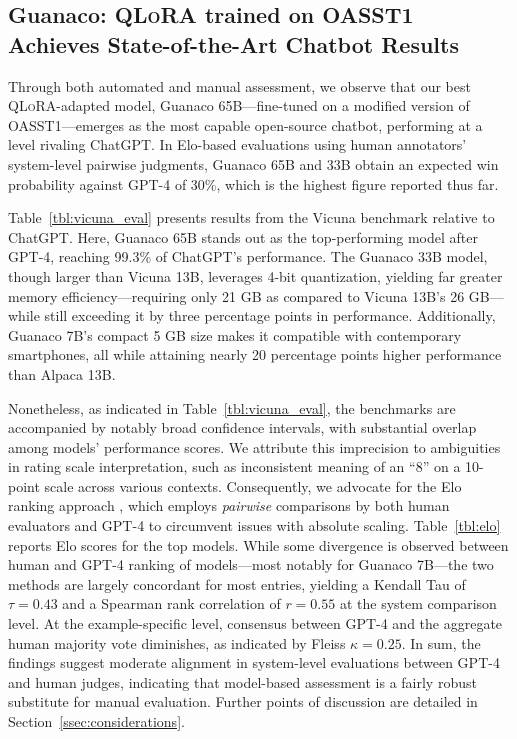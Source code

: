 \subsection{\textbf{Guanaco}: \textsc{QLoRA} trained on OASST1 Achieves State-of-the-Art Chatbot Results} 

Through both automated and manual assessment, we observe that our best \textsc{QLoRA}-adapted model, {Guanaco} 65B—fine-tuned on a modified version of OASST1—emerges as the most capable open-source chatbot, performing at a level rivaling ChatGPT. In Elo-based evaluations using human annotators’ system-level pairwise judgments, {Guanaco} 65B and 33B obtain an expected win probability against GPT-4 of 30\%, which is the highest figure reported thus far.

Table~\ref{tbl:vicuna_eval} presents results from the Vicuna benchmark \cite{vicuna2023} relative to ChatGPT. Here, {Guanaco} 65B stands out as the top-performing model after GPT-4, reaching 99.3\% of ChatGPT’s performance. The {Guanaco} 33B model, though larger than Vicuna 13B, leverages 4-bit quantization, yielding far greater memory efficiency—requiring only 21 GB as compared to Vicuna 13B’s 26 GB—while still exceeding it by three percentage points in performance. Additionally, {Guanaco} 7B’s compact 5 GB size makes it compatible with contemporary smartphones, all while attaining nearly 20 percentage points higher performance than Alpaca 13B.

Nonetheless, as indicated in Table~\ref{tbl:vicuna_eval}, the benchmarks are accompanied by notably broad confidence intervals, with substantial overlap among models’ performance scores. We attribute this imprecision to ambiguities in rating scale interpretation, such as inconsistent meaning of an “8” on a 10-point scale across various contexts. Consequently, we advocate for the Elo ranking approach \citep{elo1967proposed}, which employs \textit{pairwise} comparisons by both human evaluators and GPT-4 to circumvent issues with absolute scaling. Table~\ref{tbl:elo} reports Elo scores for the top models. While some divergence is observed between human and GPT-4 ranking of models—most notably for Guanaco 7B—the two methods are largely concordant for most entries, yielding a Kendall Tau of $\tau=0.43$ and a Spearman rank correlation of $r=0.55$ at the system comparison level. At the example-specific level, consensus between GPT-4 and the aggregate human majority vote diminishes, as indicated by Fleiss $\kappa=0.25$. In sum, the findings suggest moderate alignment in system-level evaluations between GPT-4 and human judges, indicating that model-based assessment is a fairly robust substitute for manual evaluation. Further points of discussion are detailed in Section~\ref{ssec:considerations}.

